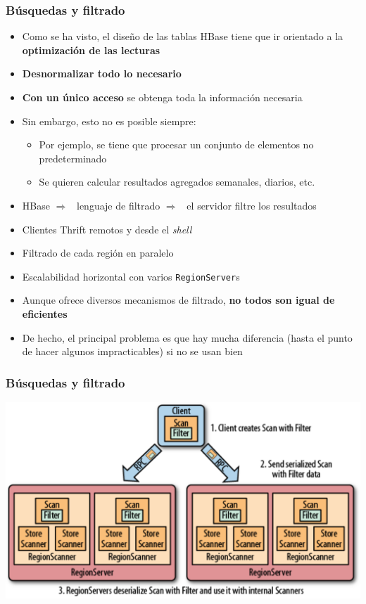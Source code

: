 \documentclass[14pt]{beamer}
\newcommand{\ra}{{\color{blue} $\Rightarrow${}~{}}}
\begin{document}
\begin{frame}[allowframebreaks]
  \frametitle{Búsquedas y filtrado}
\begin{itemize}
\item Como se ha visto, el diseño de las tablas HBase tiene que ir
  orientado a la {\bf optimización de las lecturas}
\item {\bf Desnormalizar todo lo necesario}
\item {\bf Con un único acceso} se obtenga toda la información necesaria
\item Sin embargo, esto no es posible siempre:
  \begin{itemize}
  \item Por ejemplo, se tiene que procesar un conjunto de elementos no
    predeterminado
  \item Se quieren calcular resultados agregados semanales, diarios, etc.
  \end{itemize}

\framebreak

\item HBase \ra{} lenguaje de filtrado \ra{} el servidor filtre los
  resultados
\item Clientes Thrift remotos y desde el {\em shell}
\item Filtrado de cada región en paralelo
\item Escalabilidad horizontal con varios {\tt RegionServer}s
\item Aunque ofrece diversos mecanismos de filtrado, {\bf no todos son
    igual de eficientes}
\item De hecho, el principal problema es que hay mucha diferencia (hasta el
  punto de hacer algunos impracticables) si no se usan bien
\end{itemize}
\end{frame}

\begin{frame}
  \frametitle{Búsquedas y filtrado}
  \includegraphics[width=\textwidth]{img/filter-region-server}
\end{frame}
\end{document}
